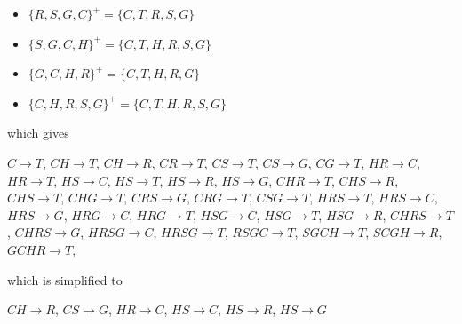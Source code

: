 \documentclass[12pt]{article}
\begin{document}
\begin{enumerate}[1.]
\begin{enumerate}[a)]
\begin{itemize}
\begin{enumerate}[1.]
\begin{itemize}
\begin{mdframed}
\begin{itemize}
                            \item $\{R,S,G,C\}^+ = \{C,T,R,S,G\}$
                            \item $\{S,G,C,H\}^+ = \{C,T,H,R,S,G\}$
                            \item $\{G,C,H,R\}^+ = \{C,T,H,R,G\}$
                            \item $\{C,H,R,S,G\}^+ = \{C,T,H,R,S,G\}$
                        \end{itemize}

                        \bigskip

                        which gives

                        \bigskip

                        $C \to T$,
                        $CH \to T$,
                        $CH \to R$,
                        $CR \to T$,
                        $CS \to T$,
                        $CS \to G$,
                        $CG \to T$,
                        $HR \to C$,
                        $HR \to T$,
                        $HS \to C$,
                        $HS \to T$,
                        $HS \to R$,
                        $HS \to G$,
                        $CHR \to T$,
                        $CHS \to R$,
                        $CHS \to T$,
                        $CHG \to T$,
                        $CRS \to G$,
                        $CRG \to T$,
                        $CSG \to T$,
                        $HRS \to T$,
                        $HRS \to C$,
                        $HRS \to G$,
                        $HRG \to C$,
                        $HRG \to T$,
                        $HSG \to C$,
                        $HSG \to T$,
                        $HSG \to R$,
                        $CHRS \to T$,
                        $CHRS \to G$,
                        $HRSG \to C$,
                        $HRSG \to T$,
                        $RSGC \to T$,
                        $SGCH \to T$,
                        $SCGH \to R$,
                        $GCHR \to T$,

                        \bigskip

                        which is simplified to

                        \bigskip

                        $CH \to R$,
                        $CS \to G$,
                        $HR \to C$,
                        $HS \to C$,
                        $HS \to R$,
                        $HS \to G$
                    \end{mdframed}


\end{itemize}
\end{enumerate}
\end{itemize}
\end{enumerate}
\end{enumerate}
\end{document}
